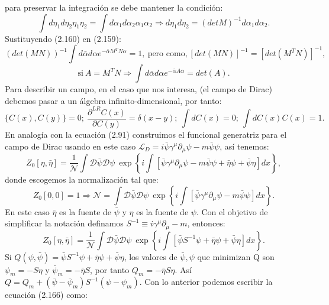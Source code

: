 para preservar la integración se debe mantener la condición:
\begin{equation}
\int d\eta_{1}d\eta_{2}\eta_{1}\eta_{2}=\int d\alpha_{1}d\alpha_{2}\alpha_{1}\alpha_{2}\Rightarrow d\eta_{1}d\eta_{2}=(detM)^{-1}d\alpha_{1}d\alpha_{2}.
\end{equation}
Sustituyendo (2.160) en (2.159):
\begin{equation}
\nonumber (det(MN))^{-1}\int d\bar{\alpha}d\alpha e^{-\bar{\alpha}M^{T}N\alpha}=1,\ \text{pero como,}\  \left[det(MN)\right]^{-1}=\left[det(M^{T}N)\right]^{-1},
\end{equation}
\begin{equation}
\text{si}\ A=M^TN\Rightarrow \int d\bar{\alpha}d\alpha e^{-\bar{\alpha}A\alpha}=det(A).
\end{equation}	
Para describir un campo, en el caso que nos interesa, (el campo de Dirac) debemos pasar a un álgebra infinito-dimensional, por tanto:
\begin{equation}
\{C(x),C(y)\}=0; \ \frac{\partial^{LR}C(x)}{\partial C(y)}=\delta(x-y); \ \int dC(x)=0; \ \int dC(x)C(x)=1.
\end{equation}
En analogía con la ecuación (2.91) construimos el funcional generatriz para el campo de Dirac usando en este caso $\mathcal{L}_D=i\bar{\psi}\gamma^{\mu}\partial_{\mu}\psi-m\bar{\psi}\psi$, así tenemos:
\begin{equation}
Z_{0}[\eta,\bar{\eta}]=\frac{1}{\mathcal{N}}\int\mathcal{D}\bar{\psi}\mathcal{\mathcal{D}}\psi\ \exp\left\{ i\int\left[\bar{\psi}\gamma^{\mu}\partial_{\mu}\psi-m\bar{\psi}\psi+\bar{\eta}\psi+\bar{\psi}\eta\right]dx\right\} ,
\end{equation}
donde escogemos la normalización tal que:
\begin{equation}
Z_{0}[0,0]=1\Rightarrow\mathcal{N}=\int\mathcal{D}\bar{\psi}\mathcal{\mathcal{D}}\psi\ \exp\left\{ i\int\left[\bar{\psi}\gamma^{\mu}\partial_{\mu}\psi-m\bar{\psi}\psi\right]dx\right\} .
\end{equation}
En este caso $\bar{\eta}$ es la fuente de $\bar{\psi}$ y $\eta$ es la fuente de $\psi$. Con el objetivo de simplificar la notación definamos $S^{-1}\equiv i\gamma^{\mu}\partial_{\mu}-m$, entonces:
\begin{equation}
Z_{0}[\eta,\bar{\eta}]=\frac{1}{\mathcal{N}}\int\mathcal{D}\bar{\psi}\mathcal{\mathcal{D}}\psi\ \exp\left\{ i\int\left[\bar{\psi}S^{-1}\psi+\bar{\eta}\psi+\bar{\psi}\eta\right]dx\right\}.
\end{equation} 
Si $Q(\psi,\bar{\psi})=\bar{\psi}S^{-1}\psi+\bar{\eta}\psi+\bar{\psi}\eta$, los valores de $\bar{\psi},\psi$ que minimizan Q son $\psi_m=-S\eta$ y $\bar{\psi}_m=-\bar{\eta}S$, por tanto $Q_m=-\bar{\eta}S\eta$. Así $Q=Q_m+(\bar{\psi}-\bar{\psi}_m)S^{-1}(\psi-\psi_m)$. Con lo anterior podemos escribir la ecuación (2.166) como:
